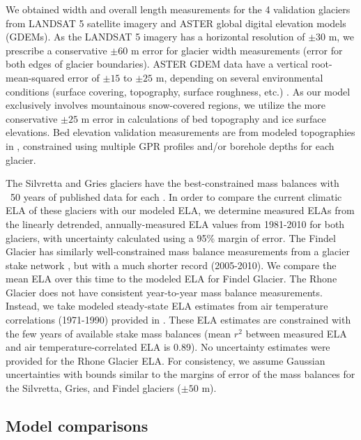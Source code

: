 \documentclass[review]{elsarticle}
\begin{document}
We obtained width and overall length measurements for the 4 validation glaciers from LANDSAT 5 satellite imagery and ASTER global digital elevation models (GDEMs).
As the LANDSAT 5 imagery has a horizontal resolution of $\pm 30$ m, we prescribe a conservative $\pm 60$ m error for glacier width measurements (error for both edges of glacier boundaries).
ASTER GDEM data have a vertical root-mean-squared error of $\pm 15$ to $\pm 25$ m, depending on several environmental conditions (surface covering, topography, surface roughness, etc.) \cite{aster_aster_2009}.
As our model exclusively involves mountainous snow-covered regions, we utilize the more conservative $\pm 25$ m error in calculations of bed topography and ice surface elevations.
Bed elevation validation measurements are from modeled topographies in \cite{farinotti_method_2009, farinotti_simple_2010}, constrained using multiple GPR profiles and/or borehole depths for each glacier.

The Silvretta and Gries glaciers have the best-constrained mass balances with ~50 years of published data for each \cite{wgms_fluctuations_2019}.
In order to compare the current climatic ELA of these glaciers with our modeled ELA, we determine measured ELAs from the linearly detrended, annually-measured ELA values from 1981-2010 for both glaciers, with uncertainty calculated using a 95\% margin of error.
The Findel Glacier has similarly well-constrained mass balance measurements from a glacier stake network \cite{wgms_fluctuations_2019}, but with a much shorter record (2005-2010).
We compare the mean ELA over this time to the modeled ELA for Findel Glacier.
The Rhone Glacier does not have consistent year-to-year mass balance measurements.
Instead, we take modeled steady-state ELA estimates from air temperature correlations (1971-1990) provided in \cite{zemp_distributed_2007}.
These ELA estimates are constrained with the few years of available stake mass balances (mean $r^2$ between measured ELA and air temperature-correlated ELA is 0.89).
No uncertainty estimates were provided for the Rhone Glacier ELA.
For consistency, we assume Gaussian uncertainties with bounds similar to the margins of error of the mass balances for the Silvretta, Gries, and Findel glaciers ($\pm 50$ m).

\subsection{Model comparisons}
\end{document}
